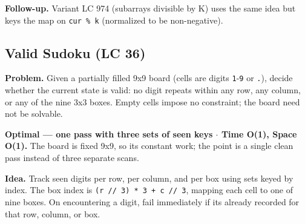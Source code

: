 \documentclass[11pt]{article}
\begin{document}
\textbf{Follow-up.} Variant LC 974 (subarrays divisible by K) uses the same idea but keys the map on \texttt{cur\ \%\ k} (normalized to be non-negative).

\subsection{Valid Sudoku (LC 36)}\label{valid-sudoku-lc-36}

\textbf{Problem.} Given a partially filled 9x9 board (cells are digits \texttt{\textquotesingle{}1\textquotesingle{}}-\texttt{\textquotesingle{}9\textquotesingle{}} or \texttt{\textquotesingle{}.\textquotesingle{}}), decide whether the current state is valid: no digit repeats within any row, any column, or any of the nine 3x3 boxes. Empty cells impose no constraint; the board need not be solvable.

\textbf{Optimal --- one pass with three sets of seen keys \(\cdot\) Time O(1), Space O(1).} The board is fixed 9x9, so it\textquotesingle s constant work; the point is a single clean pass instead of three separate scans.

\textbf{Idea.} Track seen digits per row, per column, and per box using sets keyed by index. The box index is \texttt{(r\ //\ 3)\ *\ 3\ +\ c\ //\ 3}, mapping each cell to one of nine boxes. On encountering a digit, fail immediately if it\textquotesingle s already recorded for that row, column, or box.

\end{document}
